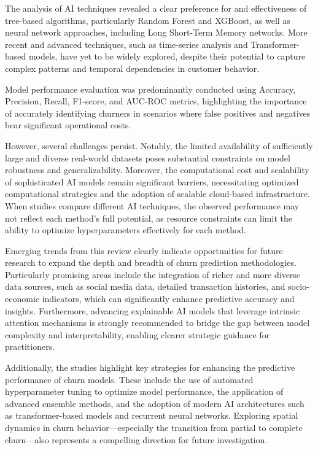 The analysis of AI techniques revealed a clear preference for and effectiveness of tree-based algorithms, particularly Random Forest and XGBoost, as well as neural network approaches, including Long Short-Term Memory networks. More recent and advanced techniques, such as time-series analysis and Transformer-based models, have yet to be widely explored, despite their potential to capture complex patterns and temporal dependencies in customer behavior.

Model performance evaluation was predominantly conducted using Accuracy, Precision, Recall, F1-score, and AUC-ROC metrics, highlighting the importance of accurately identifying churners in scenarios where false positives and negatives bear significant operational costs. 

However, several challenges persist. Notably, the limited availability of sufficiently large and diverse real-world datasets poses substantial constraints on model robustness and generalizability. Moreover, the computational cost and scalability of sophisticated AI models remain significant barriers, necessitating optimized computational strategies and the adoption of scalable cloud-based infrastructure. When studies compare different AI techniques, the observed performance may not reflect each method's full potential, as resource constraints can limit the ability to optimize hyperparameters effectively for each method.

Emerging trends from this review clearly indicate opportunities for future research to expand the depth and breadth of churn prediction methodologies. Particularly promising areas include the integration of richer and more diverse data sources, such as social media %
data, detailed transaction histories, and socio-economic indicators, which can significantly enhance predictive accuracy and insights. Furthermore, advancing explainable AI models that leverage intrinsic attention mechanisms is strongly recommended to bridge the gap between model complexity and interpretability, enabling clearer strategic guidance for practitioners.

Additionally, the studies highlight key strategies for enhancing the predictive performance of churn models. These include the use of automated hyperparameter tuning to optimize model performance, the application of advanced ensemble methods, and the adoption of modern AI architectures such as transformer-based models and recurrent neural networks. Exploring spatial dynamics in churn behavior---especially the transition from partial to complete churn---also represents a compelling direction for future investigation.
